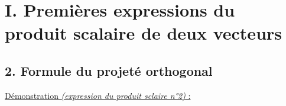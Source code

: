 \documentclass[11pt,a4paper]{article}
\title{\doctitre}
\author{\docniveau \\ \doctheme\text{ - }\doctype}
\date{}
\begin{document}
\maketitle
\pagestyle{custom}
\thispagestyle{custom}

\section*{I. Premières expressions du produit scalaire de deux vecteurs}

\subsection*{2. Formule du projeté orthogonal}

\underline{Démonstration \emph{(expression du produit sclaire n°2)} :}
\end{document}
